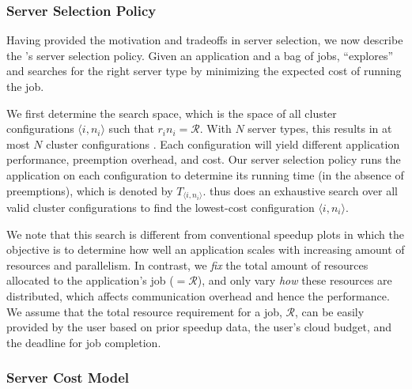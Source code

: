 \subsubsection{Server Selection Policy}

Having provided the motivation and tradeoffs in server selection, we now describe the \sysname's server selection policy. 
Given an application and a bag of jobs, \sysname ``explores'' and searches for the right server type by minimizing the expected cost of running the job. 

We first determine the search space, which is the space of all cluster configurations $\langle i,n_i \rangle$  such that $r_i n_i = \mathcal{R}$.  With $N$ server types, this results in at most $N$ cluster configurations .
Each configuration will yield different application performance, preemption overhead, and cost.
Our server selection policy runs the application on each configuration to determine its running time (in the absence of preemptions), which is denoted by $T_{\langle i,n_i \rangle}$. 
\sysname thus does an exhaustive search over all valid cluster configurations to find the lowest-cost configuration $\langle i, n_i \rangle$. 

We note that this search is different from conventional speedup plots in which the objective is to determine how well an application scales with increasing amount of resources and parallelism. 
In contrast, we \emph{fix} the total amount of resources allocated to the application's job ($=\mathcal{R}$), and only vary \emph{how} these resources are distributed, which affects communication overhead and hence the performance.
We assume that the total resource requirement for a job, $\mathcal{R}$, can be easily provided by the user based on prior speedup data, the user's cloud budget, and the deadline for job completion. 



\subsubsection{Server Cost Model}


